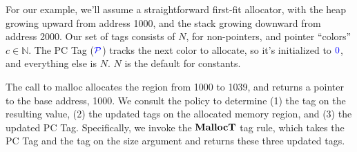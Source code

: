 \documentclass[acmsmall,review,anonymous]{acmart}\settopmatter{printfolios=true,printccs=false,printacmref=false}
\begin{document}
For our example, we'll assume a straightforward first-fit allocator, with the heap growing upward
from address 1000, and the stack growing downward from address 2000. Our set of tags consists of
\(N\), for non-pointers, and pointer ``colors'' \(c \in \mathbb{N}\). The PC Tag
(\(\mathcal{\color{blue} P}\)) tracks the next color to allocate, so it's initialized to \({\color{blue} 0}\), and everything else is \(N\).
\(N\) is the default for constants.


The call to malloc allocates the region from 1000 to 1039, and returns a pointer to the base
address, 1000. We consult the policy to determine (1) the tag on the resulting value,
(2) the updated tags on the allocated memory region, and (3) the updated PC Tag.
Specifically, we invoke the \(\mathbf{MallocT}\) tag rule, which takes the PC Tag and the tag on
the size argument and returns these three updated tags.
\end{document}
